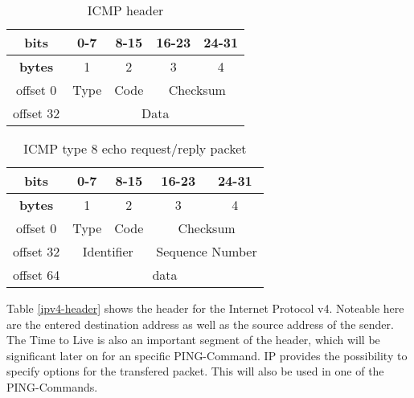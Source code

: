 \begin{table}[H]
	\centering
	\label{abstract-icmp-header}
	\begin{tabular}{|c|c|c|c|c|}
		\hline
		\textbf{bits}  & 0-7  & 8-15 & 16-23         & 24-31         \\ \hline
		\textbf{bytes} & 1    & 2    & 3             & 4             \\ \hline
		offset 0       & Type & Code & \multicolumn{2}{c|}{Checksum} \\ \hline
		offset 32      & \multicolumn{4}{c|}{Data}                   \\ \hline
	\end{tabular}
	\caption{ICMP header}
\end{table}

\begin{table}[H]
	\centering
	\label{icmp-echo-request-header}
	\begin{tabular}{|c|c|c|c|c|}
		\hline
		\textbf{bits}                   & 0-7            & 8-15           & 16-23             & 24-31            \\ \hline
		\textbf{bytes}                  & 1              & 2              & 3                 & 4                \\ \hline
		offset 0                        & Type           & Code           & \multicolumn{2}{c|}{Checksum}        \\ \hline
		\multicolumn{1}{|l|}{offset 32} & \multicolumn{2}{c|}{Identifier} & \multicolumn{2}{c|}{Sequence Number} \\ \hline
		offset 64                       & \multicolumn{4}{c|}{data}                                              \\ \hline
	\end{tabular}
	\caption{ICMP type 8 echo request/reply packet }
	
\end{table}

Table \ref{ipv4-header} shows the header for the Internet Protocol v4. Noteable here are the entered destination address as well as the source address of the sender. The Time to Live is also an important segment of the header, which will be significant later on for an specific PING-Command. IP provides the possibility to specify options for the transfered packet. This will also be used in one of the PING-Commands.

